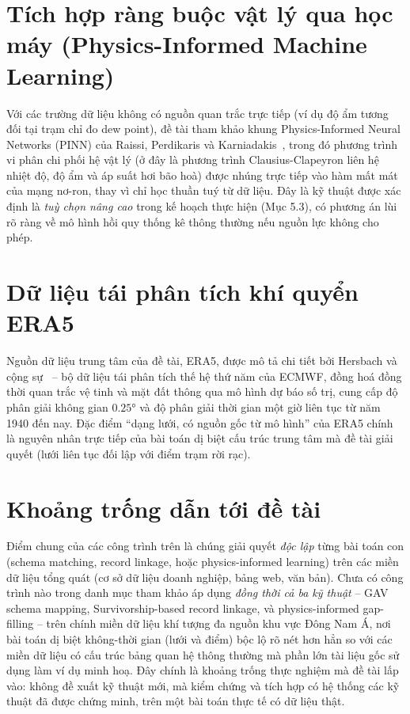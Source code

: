 \documentclass[12pt,a4paper]{report}
\begin{document}
\section{Tích hợp ràng buộc vật lý qua học máy (Physics-Informed Machine Learning)}

Với các trường dữ liệu không có nguồn quan trắc trực tiếp (ví dụ độ ẩm tương đối tại trạm chỉ đo dew point), đề tài tham khảo khung Physics-Informed Neural Networks (PINN) của Raissi, Perdikaris và Karniadakis~\cite{raissi2019physics}, trong đó phương trình vi phân chi phối hệ vật lý (ở đây là phương trình Clausius-Clapeyron liên hệ nhiệt độ, độ ẩm và áp suất hơi bão hoà) được nhúng trực tiếp vào hàm mất mát của mạng nơ-ron, thay vì chỉ học thuần tuý từ dữ liệu. Đây là kỹ thuật được xác định là \emph{tuỳ chọn nâng cao} trong kế hoạch thực hiện (Mục 5.3), có phương án lùi rõ ràng về mô hình hồi quy thống kê thông thường nếu nguồn lực không cho phép.

\section{Dữ liệu tái phân tích khí quyển ERA5}

Nguồn dữ liệu trung tâm của đề tài, ERA5, được mô tả chi tiết bởi Hersbach và cộng sự~\cite{hersbach2020era5} -- bộ dữ liệu tái phân tích thế hệ thứ năm của ECMWF, đồng hoá đồng thời quan trắc vệ tinh và mặt đất thông qua mô hình dự báo số trị, cung cấp độ phân giải không gian $0.25°$ và độ phân giải thời gian một giờ liên tục từ năm 1940 đến nay. Đặc điểm ``dạng lưới, có nguồn gốc từ mô hình'' của ERA5 chính là nguyên nhân trực tiếp của bài toán dị biệt cấu trúc trung tâm mà đề tài giải quyết (lưới liên tục đối lập với điểm trạm rời rạc).

\section{Khoảng trống dẫn tới đề tài}

Điểm chung của các công trình trên là chúng giải quyết \emph{độc lập} từng bài toán con (schema matching, record linkage, hoặc physics-informed learning) trên các miền dữ liệu tổng quát (cơ sở dữ liệu doanh nghiệp, bảng web, văn bản). Chưa có công trình nào trong danh mục tham khảo áp dụng \emph{đồng thời cả ba kỹ thuật} -- GAV schema mapping, Survivorship-based record linkage, và physics-informed gap-filling -- trên chính miền dữ liệu khí tượng đa nguồn khu vực Đông Nam Á, nơi bài toán dị biệt không-thời gian (lưới và điểm) bộc lộ rõ nét hơn hẳn so với các miền dữ liệu có cấu trúc bảng quan hệ thông thường mà phần lớn tài liệu gốc sử dụng làm ví dụ minh hoạ. Đây chính là khoảng trống thực nghiệm mà đề tài lấp vào: không đề xuất kỹ thuật mới, mà kiểm chứng và tích hợp có hệ thống các kỹ thuật đã được chứng minh, trên một bài toán thực tế có dữ liệu thật.
\end{document}
